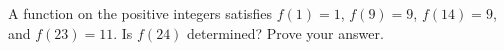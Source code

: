 A function on the positive integers satisfies $f(1)=1$, $f(9)=9$, $f(14)=9$, and $f(23)=11$. Is $f(24)$ determined? Prove your answer.
